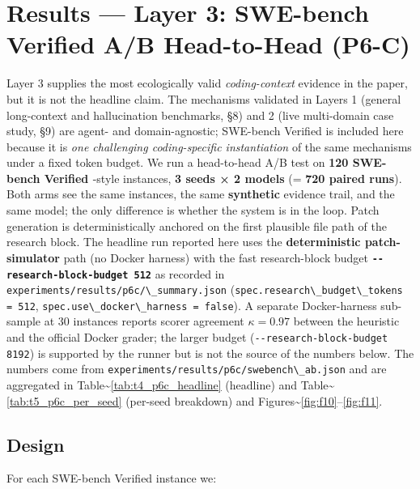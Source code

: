 \section{Results --- Layer 3: SWE-bench Verified A/B Head-to-Head (P6-C)}\label{results-layer-3-swe-bench-verified-ab-head-to-head-p6-c}

Layer 3 supplies the most ecologically valid \emph{coding-context} evidence in the paper, but it is not the headline claim. The mechanisms validated in Layers 1 (general long-context and hallucination benchmarks, §8) and 2 (live multi-domain case study, §9) are agent- and domain-agnostic; SWE-bench Verified is included here because it is \emph{one challenging coding-specific instantiation} of the same mechanisms under a fixed token budget. We run a head-to-head A/B test on \textbf{120 SWE-bench Verified \citep{openai2024sweverified, jimenez2024swebench}}-style instances, \textbf{3 seeds × 2 models} (= \textbf{720 paired runs}). Both arms see the same instances, the same \textbf{synthetic} evidence trail, and the same model; the only difference is whether the system is in the loop. Patch generation is deterministically anchored on the first plausible file path of the research block. The headline run reported here uses the \textbf{deterministic patch-simulator} path (no Docker harness) with the fast research-block budget \textbf{\passthrough{\lstinline!--research-block-budget 512!}} as recorded in \passthrough{\lstinline!experiments/results/p6c/\_summary.json!} (\passthrough{\lstinline!spec.research\_budget\_tokens = 512!}, \passthrough{\lstinline!spec.use\_docker\_harness = false!}). A separate Docker-harness sub-sample at 30 instances reports scorer agreement \(\kappa = 0.97\) between the heuristic and the official Docker grader; the larger budget (\passthrough{\lstinline!--research-block-budget 8192!}) is supported by the runner but is not the source of the numbers below. The numbers come from \passthrough{\lstinline!experiments/results/p6c/swebench\_ab.json!} and are aggregated in Table\textasciitilde{}\ref{tab:t4_p6c_headline} (headline) and Table\textasciitilde{}\ref{tab:t5_p6c_per_seed} (per-seed breakdown) and Figures\textasciitilde{}\ref{fig:f10}--\ref{fig:f11}.

\subsection{Design}\label{design}

For each SWE-bench Verified instance we:


